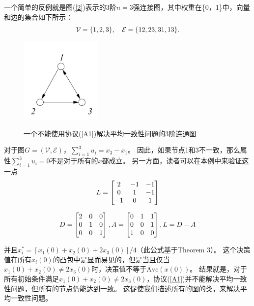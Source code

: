 \documentclass{article}
\begin{document}
一个简单的反例就是图(\ref{2})表示的3阶$n=3$强连接图，其中权重在\{0，1\}中，向量和边的集合如下所示：
\begin{equation}
    \mathcal{V} = \{1, 2, 3 \},\quad \mathcal{E}=\{12, 23, 31, 13\}.
    \notag
\end{equation}
\begin{figure}[htbp]
    \centering
    \includegraphics[width=4cm]{figures/Fig2-ConnectedDigraph.jpeg}
    \label{ConnectedDigraph}
    \caption{一个不能使用协议(\ref{A1})解决平均一致性问题的3阶连通图}
\end{figure}

对于图$G=(\mathcal{V}, \mathcal{E})$，$\sum_{i=1}^{3}u_i = x_3 - x_1$。
因此，如果节点1和3不一致，那么属性$\sum_{i=1}^{3}u_i = 0$不是对于所有的$x$都成立。
另一方面，读者可以在本例中来验证这一点
\begin{equation}
    L = \left[
    \begin{matrix}
        2 & -1 & -1 \\
        0 & 1 & -1 \\
        -1 & 0 & 1 
    \end{matrix}
    \right]
    \notag
\end{equation}

{\color{userColor}
\begin{equation}
    D = \left[
    \begin{matrix}
        2 & 0 & 0 \\
        0 & 1 & 0 \\
        0 & 0 & 1 
    \end{matrix}
    \right],
    A = \left[
    \begin{matrix}
        0 & 1 & 1 \\
        0 & 0 & 1 \\
        1 & 0 & 0 
    \end{matrix}
    \right],
    L = D - A
    \notag
\end{equation}
}

并且$x^*_i = [x_1(0) + x_2(0) + 2x_3(0)]/4$（此公式基于Theorem 3）。
这个决策值在所有$x_i(0)$的凸包中是显而易见的，但是当且仅当$x_1(0) + x_2(0) \ne 2x_3(0)$时，决策值不等于$\text{Ave}(x(0))$。
结果就是，对于所有初始条件满足$x_1(0) + x_2(0) \ne 2x_3(0)$，协议(\ref{A1})并不能解决平均一致性问题，但所有的节点仍能达到一致。
这促使我们描述所有的图的类，来解决平均一致性问题。
\end{document}
